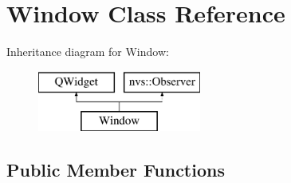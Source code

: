 \hypertarget{class_window}{}\section{Window Class Reference}
\label{class_window}
Inheritance diagram for Window\+:\begin{figure}[H]
\begin{center}
\leavevmode
\includegraphics[height=2.000000cm]{class_window}
\end{center}
\end{figure}
\subsection*{Public Member Functions}
